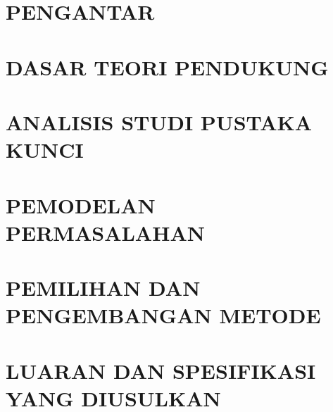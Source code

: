 \documentclass{DTETI_CP_C251}
\begin{document}

\maketitle


\chapter{\uppercase{Pengantar}}
\label{chap:Pengantar}


\chapter{\uppercase{Dasar Teori Pendukung}}
\label{chap:Dasar_Teori_Pendukung}


\chapter{\uppercase{Analisis Studi Pustaka Kunci}}
\label{chap:Analisis_Studi_Pustaka_Kunci}


\chapter{\uppercase{Pemodelan Permasalahan}}
\label{chap:Pemodelan_Permasalahan}


\chapter{\uppercase{Pemilihan dan Pengembangan Metode}}
\label{chap:Pemilihan_dan_Pengembangan_Metode}



\chapter{\uppercase{Luaran dan Spesifikasi yang Diusulkan}}
\label{chap:Luaran_dan_Spesifikasi_yang_Diusulkan}

\end{document}
